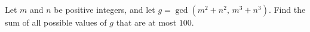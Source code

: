 Let $m$ and $n$ be positive integers, and let $g = \gcd(m^2 + n^2,\, m^3 + n^3)$. Find the sum of all possible values of $g$ that are at most $100$.
